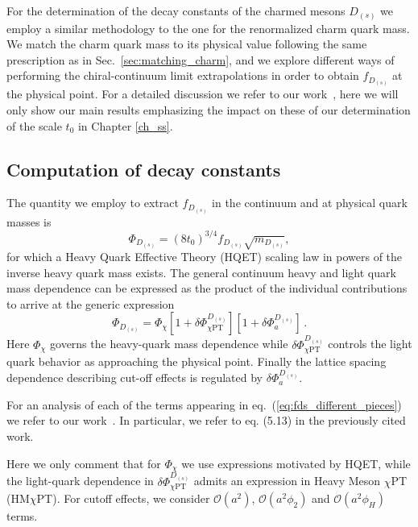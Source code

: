 For the determination of the decay constants of the charmed mesons $D_{(s)}$ we employ a similar methodology to the one for the renormalized charm quark mass. We match the charm quark mass to its physical value following the same prescription as in Sec.~\ref{sec:matching_charm}, and we explore different ways of performing the chiral-continuum limit extrapolations in order to obtain $f_{D_{(s)}}$ at the physical point. For a detailed discussion we refer to our work~\citep{charm}, here we will only show our main results emphasizing the impact on these of our determination of the scale $t_0$ in Chapter \ref{ch_ss}.

\subsection{Computation of decay constants}

The quantity we employ to extract $f_{D_{(s)}}$ in the continuum and at physical quark masses is
\begin{equation}
  \Phi_{D_{(s)}} = (8t_0)^{3/4}f_{D_{(s)}} \sqrt{m_{D_{(s)}}},
  \label{eq:defphiD}
\end{equation}
for which a Heavy Quark Effective Theory (HQET) scaling law in powers of the inverse
heavy quark mass exists.
The general continuum heavy and light quark mass dependence can be expressed as the product of the individual contributions to arrive at the generic expression 
\begin{equation}
	\Phi_{D_{(s)}} = \Phi_{\chi} \left[
	1 + \delta\Phi_{\chi\mathrm{PT}}^{D_{(s)}}
	\right]
	\left[
	1 + \delta\Phi_a^{D_{(s)}}
	\right]\,.
	\label{eq:fds_different_pieces}
\end{equation}
Here $\Phi_\chi$ governs the heavy-quark mass dependence while  $\delta\Phi_{\chi\mathrm{PT}}^{D_{(s)}}$ controls the light quark behavior as approaching the physical point. Finally the lattice spacing dependence describing cut-off effects is regulated by $\delta\Phi_a^{D_{(s)}}$. 

For an analysis of each of the terms appearing in eq.~(\ref{eq:fds_different_pieces}) we refer to our work~\citep{charm}. In particular, we refer to eq. (5.13) in the previously cited work.

Here we only comment that for $\Phi_{\chi}$ we use expressions motivated by HQET, while the light-quark dependence in $\delta\Phi_{\chi\mathrm{PT}}^{D_{(s)}}$ admits an expression in Heavy Meson $\chi$PT (HM$\chi$PT). For cutoff effects, we consider $\mathcal{O}(a^2)$, $\mathcal{O}(a^2\phi_2)$ and $\mathcal{O}(a^2\phi_H)$ terms.


